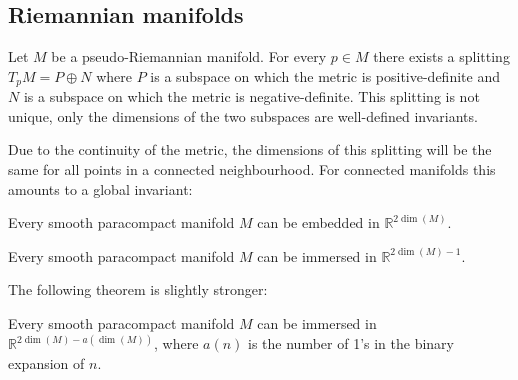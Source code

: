 \subsection{Riemannian manifolds}


    \begin{property}
        Let $M$ be a pseudo-Riemannian manifold. For every $p\in M$ there exists a splitting $T_pM = P\oplus N$ where $P$ is a subspace on which the metric is positive-definite and $N$ is a subspace on which the metric is negative-definite. This splitting is not unique, only the dimensions of the two subspaces are well-defined invariants.
    \end{property}
    Due to the continuity of the metric, the dimensions of this splitting will be the same for all points in a connected neighbourhood. For connected manifolds this amounts to a global invariant:

    \begin{theorem}
        Every smooth paracompact manifold $M$ can be embedded in $\mathbb{R}^{2\dim(M)}$.
    \end{theorem}
    \begin{theorem}
        Every smooth paracompact manifold $M$ can be immersed in $\mathbb{R}^{2\dim(M)-1}$.
    \end{theorem}
    The following theorem is slightly stronger:
    \begin{theorem}
        Every smooth paracompact manifold $M$ can be immersed in $\mathbb{R}^{2\dim(M)-a(\dim(M))}$, where $a(n)$ is the number of 1's in the binary expansion of $n$.
    \end{theorem}


